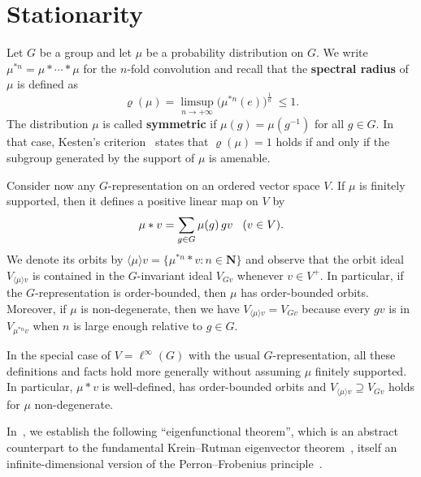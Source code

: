 \documentclass[11pt]{amsart}
\numberwithin{equation}{section}
\theoremstyle{definition}
\theoremstyle{definition}
\newcommand*{\NN}{\mathbf{N}}
\newcommand*{\inv}{^{-1}}
\begin{document}
\section{Stationarity}\label{sec:stat}%
Let $G$ be a group and let $\mu$ be a probability distribution on $G$. We write $\mu^{*n} = \mu * \cdots * \mu$ for the $n$-fold convolution and recall that the \textbf{spectral radius} of $\mu$ is defined as
\begin{equation*}
\varrho(\mu) = \limsup_{n\to+\infty} \big( \mu^{*n} (e) \big)^{\frac1n}\ \leq 1.
\end{equation*}
The distribution $\mu$ is called \textbf{symmetric} if $\mu(g)=\mu(g\inv)$ for all $g\in G$. In that case, Kesten's criterion~\cite{Kesten59,Kesten59bis} states that $\varrho(\mu)=1$ holds if and only if the subgroup generated by the support of $\mu$ is amenable.

\medskip
Consider now any $G$-representation on an ordered vector space $V$. If $\mu$ is finitely supported, then it defines a positive linear map on $V$ by
\begin{equation*}
\mu * v = \sum_{g\in G} \mu(g) \, g v \kern3mm (v\in V).
\end{equation*}
We denote its orbits by $\langle \mu \rangle v = \{\mu^{*n} * v : n\in\NN\}$ and observe that the orbit ideal $V_{\langle \mu \rangle v}$ is contained in the $G$-invariant ideal $V_{G v}$ whenever $v\in V^+$. In particular, if the $G$-representation is order-bounded, then $\mu$ has order-bounded orbits. Moreover, if $\mu$ is non-degenerate, then we have $V_{\langle \mu \rangle v}  =V_{G v}$ because every $g v$ is in $V_{\mu^{*n} v}$ when $n$ is large enough relative to $g\in G$.

In the special case of $V=\ell^\infty(G)$ with the usual $G$-representation, all these definitions and facts hold more generally without assuming $\mu$ finitely supported. In particular, $\mu * v$ is well-defined, has order-bounded orbits and $V_{\langle \mu \rangle v}  \supseteq V_{G v}$ holds for $\mu$ non-degenerate.

\medskip
In~\cite{Monod_eigenform_pre}, we establish the following ``eigenfunctional theorem'', which is an abstract counterpart to the fundamental Krein--Rutman eigenvector theorem~\cite{Krein-Rutman}, itself an infinite-dimensional version of the Perron--Frobenius principle~\cite{Perron,Frobenius1912}.
\end{document}
